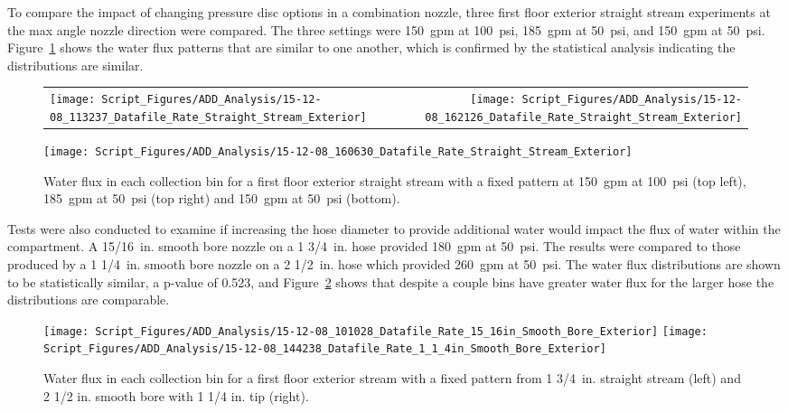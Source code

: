 \documentclass[12pt,oneside]{book}
\begin{document}
To compare the impact of changing pressure disc options in a combination nozzle, three first floor exterior straight stream experiments at the max angle nozzle direction were compared. The three settings were 150~gpm at 100~psi, 185~gpm at 50~psi, and 150~gpm at 50~psi. Figure~\ref{fig:Exterior_First_Floor_Varying_Nozzle_Pressure_SS_Fixed_Pattern} shows the water flux patterns that are similar to one another, which is confirmed by the statistical analysis indicating the distributions are similar.   

\begin{figure}[ht]
\begin{tabular*}{\textwidth}{lr}
\texttt{[image: Script\_Figures/ADD\_Analysis/15-12-08\_113237\_Datafile\_Rate\_Straight\_Stream\_Exterior]} & 
\texttt{[image: Script\_Figures/ADD\_Analysis/15-12-08\_162126\_Datafile\_Rate\_Straight\_Stream\_Exterior]} \\
\end{tabular*}
\centering
\texttt{[image: Script\_Figures/ADD\_Analysis/15-12-08\_160630\_Datafile\_Rate\_Straight\_Stream\_Exterior]}  
\caption[Water Flux Varying Pressure Discs in Combination Nozzle]{Water flux in each collection bin for a first floor exterior straight stream with a fixed pattern at 150~gpm at 100~psi (top left), 185~gpm at 50~psi (top right) and 150~gpm at 50~psi (bottom).}
\label{fig:Exterior_First_Floor_Varying_Nozzle_Pressure_SS_Fixed_Pattern}
\end{figure}

\clearpage

Tests were also conducted to examine if increasing the hose diameter to provide additional water would impact the flux of water within the compartment. A 15/16~in. smooth bore nozzle on a 1 3/4~in. hose provided 180~gpm at 50~psi. The results were compared to those produced by a 1 1/4~in. smooth bore nozzle on a 2 1/2~in. hose which provided 260~gpm at 50~psi. The water flux distributions are shown to be statistically similar, a p-value of 0.523, and Figure~\ref{fig:Exterior_First_Floor_Varying_Hose_Size} shows that despite a couple bins have greater water flux for the larger hose the distributions are comparable.

\begin{figure}[ht]
\texttt{[image: Script\_Figures/ADD\_Analysis/15-12-08\_101028\_Datafile\_Rate\_15\_16in\_Smooth\_Bore\_Exterior]}
\texttt{[image: Script\_Figures/ADD\_Analysis/15-12-08\_144238\_Datafile\_Rate\_1\_1\_4in\_Smooth\_Bore\_Exterior]} \\ 
\caption[Water Flux Varying Hose Size]{Water flux in each collection bin for a first floor exterior stream with a fixed pattern from 1 3/4~in. straight stream (left) and 2 1/2 in. smooth bore with 1 1/4 in. tip (right).}
\label{fig:Exterior_First_Floor_Varying_Hose_Size}
\end{figure}
\end{document}
